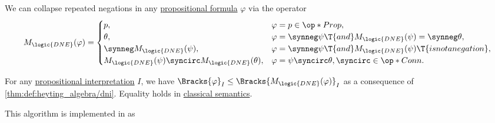 \begin{algorithm}\label{alg:propositional_repeated_negation_collapse}
  We can collapse repeated negations in any \hyperref[def:propositional_formula]{propositional formula} \( \varphi \) via the operator
  \begin{equation*}
    M_{\logic{DNE}}(\varphi) = \begin{cases}
      p,                                                      &\varphi = p \in \op*{Prop}, \\
      \theta,                                                 &\varphi = \synneg \psi \T{and} M_{\logic{DNE}}(\psi) = \synneg \theta, \\
      \synneg M_{\logic{DNE}}(\psi),                          &\varphi = \synneg \psi \T{and} M_{\logic{DNE}}(\psi) \T{is not a negation}, \\
      M_{\logic{DNE}}(\psi) \syncirc M_{\logic{DNE}}(\theta), &\varphi = \psi \syncirc \theta, {\syncirc} \in \op*{Conn}.
    \end{cases}
  \end{equation*}

  For any \hyperref[def:propositional_interpretation]{propositional interpretation} \( I \), we have \( \Bracks{\varphi}_I \leq \Bracks{M_{\logic{DNE}}(\varphi)}_I \) as a consequence of \cref{thm:def:heyting_algebra/dni}. Equality holds in \hyperref[def:truth_value_algebra/classical]{classical semantics}.
\end{algorithm}
\begin{comments}
  \item This algorithm is implemented in \cite{notebook:code} as
  \begin{CodeRefDisplay}
  \end{CodeRefDisplay}
\end{comments}

